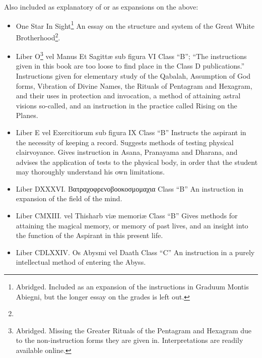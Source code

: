 Also included as explanatory of or as expansions on the above: \begin{itemize}
\item One Star In Sight\footnote{Abridged. Included as an expansion of the instructions in Graduum Montis Abiegni, but the longer essay on the grades is left out.} \textemdash{} An essay on the structure and system of the Great White Brotherhood\footnote{\Argentium{}}.
\item Liber O\footnote{Abridged. Missing the Greater Rituals of the Pentagram and Hexagram due to the non-instruction forms they are given in. Interpretations are readily available online.} vel Manus Et Sagitt\ae{} sub figura VI \textemdash{} Class \enquote{B}; \enquote{The instructions given in this book are too loose to find place in the Class D publications.} \textemdash{} Instructions given for elementary study of the Qabalah, Assumption of God forms, Vibration of Divine Names, the Rituals of Pentagram and Hexagram, and their uses in protection and invocation, a method of attaining astral visions so-called, and an instruction in the practice called Rising on the Planes.
\item Liber E vel Exercitiorum sub figura IX \textemdash{} Class \enquote{B} \textemdash{} Instructs the aspirant in the necessity of keeping a record. Suggests methods of testing physical clairvoyance. Gives instruction in Asana, Pranayama and Dharana, and advises the application of tests to the physical body, in order that the student may thoroughly understand his own limitations.
\item Liber DXXXVI. \textgreek{Βατραχοφρενοβοοκοσμομαχια} \textemdash{} Class \enquote{B} \textemdash{} An instruction in expansion of the field of the mind.
\item Liber CMXIII.  vel Thisharb vi\ae{}{} memori\ae{}{} \textemdash{} Class \enquote{B} \textemdash{} Gives methods for attaining the magical memory, or memory of past lives, and an insight into the function of the Aspirant in this present life.
\item Liber CDLXXIV. Os Abysmi vel Daath \textemdash{} Class \enquote{C} \textemdash{} An instruction in a purely intellectual method of entering the Abyss.
\end{itemize}
